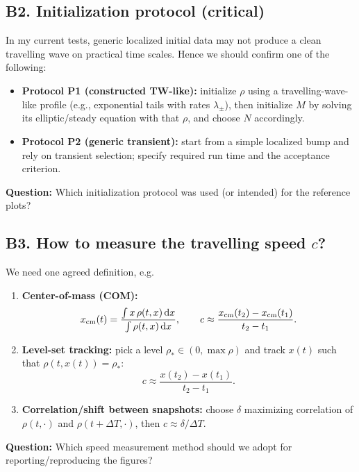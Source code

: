 \documentclass[11pt]{article}
\newcommand{\dd}{\,\mathrm{d}}
\begin{document}
\subsection*{B2. Initialization protocol (critical)}
In my current tests, generic localized initial data may not produce a clean travelling wave on practical time scales. Hence we should confirm one of the following:
\begin{itemize}[leftmargin=1.4em]
\item \textbf{Protocol P1 (constructed TW-like):} initialize $\rho$ using a travelling-wave-like profile (e.g., exponential tails with rates $\lambda_\pm$), then initialize $M$ by solving its elliptic/steady equation with that $\rho$, and choose $N$ accordingly.
\item \textbf{Protocol P2 (generic transient):} start from a simple localized bump and rely on transient selection; specify required run time and the acceptance criterion.
\end{itemize}
\textbf{Question:} Which initialization protocol was used (or intended) for the reference plots?

\subsection*{B3. How to measure the travelling speed $c$?}
We need one agreed definition, e.g.
\begin{enumerate}[leftmargin=1.8em]
\item \textbf{Center-of-mass (COM):}
\begin{equation}\label{eq:com}
x_{\rm cm}(t) = \frac{\int x\,\rho(t,x)\dd x}{\int \rho(t,x)\dd x},
\qquad
c \approx \frac{x_{\rm cm}(t_2)-x_{\rm cm}(t_1)}{t_2-t_1}.
\end{equation}
\item \textbf{Level-set tracking:} pick a level $\rho_* \in (0,\max \rho)$ and track $x(t)$ such that $\rho(t,x(t))=\rho_*$:
\begin{equation}\label{eq:levelset}
c \approx \frac{x(t_2)-x(t_1)}{t_2-t_1}.
\end{equation}
\item \textbf{Correlation/shift between snapshots:} choose $\delta$ maximizing correlation of $\rho(t,\cdot)$ and $\rho(t+\Delta T,\cdot)$, then
$c \approx \delta/\Delta T$.
\end{enumerate}
\textbf{Question:} Which speed measurement method should we adopt for reporting/reproducing the figures?
\end{document}
